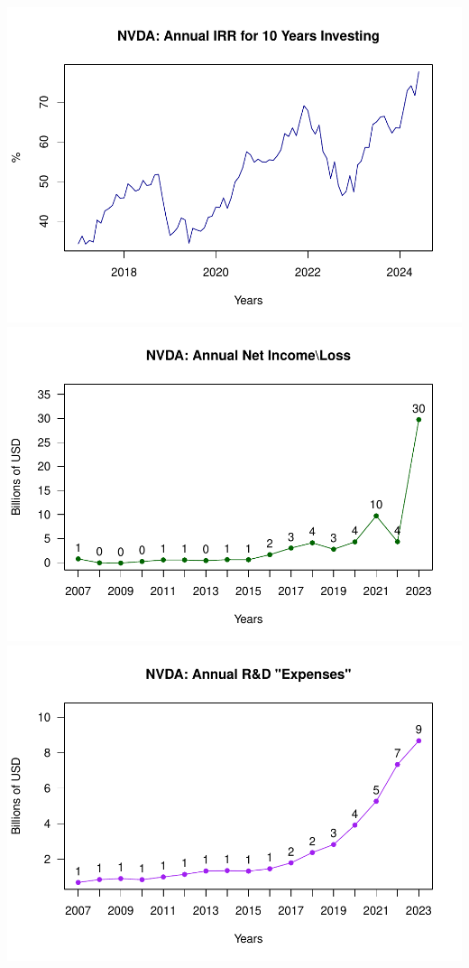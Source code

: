 \documentclass[
]{book}
\begin{document}
\includegraphics{_main_files/figure-latex/unnamed-chunk-1-1.pdf}
\includegraphics{_main_files/figure-latex/unnamed-chunk-1-2.pdf}
\includegraphics{_main_files/figure-latex/unnamed-chunk-1-3.pdf}
\end{document}
